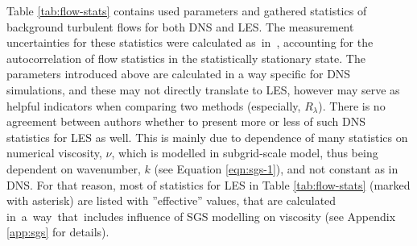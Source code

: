 \documentclass{pracamgren}
\begin{document}
Table \ref{tab:flow-stats} contains used parameters and gathered statistics of background turbulent flows for both DNS and LES.
The measurement uncertainties for these statistics were calculated as~in~\textcite{Rosa2013}, accounting for the autocorrelation of flow statistics in the statistically stationary state.
The parameters introduced above are calculated in a way specific for DNS simulations, and these may not directly translate to LES, however may serve as helpful indicators when comparing two methods (especially, $R_{\lambda}$).
There is no agreement between authors whether to present more \parencite{Rosa2017} or less \parencite{Yang2008} of such DNS statistics for LES as well.
This is mainly due to dependence of many statistics on numerical viscosity, $\nu$, which is modelled in subgrid-scale model, thus being dependent on wavenumber, $k$ (see Equation \ref{eqn:sgs-1}), and not constant as in DNS.
For that reason, most of statistics for LES in Table \ref{tab:flow-stats} (marked with asterisk) are listed with ''effective'' values, that are calculated in~a~way~that~includes influence of SGS modelling on viscosity (see Appendix \ref{app:sgs} for details). 
\end{document}
